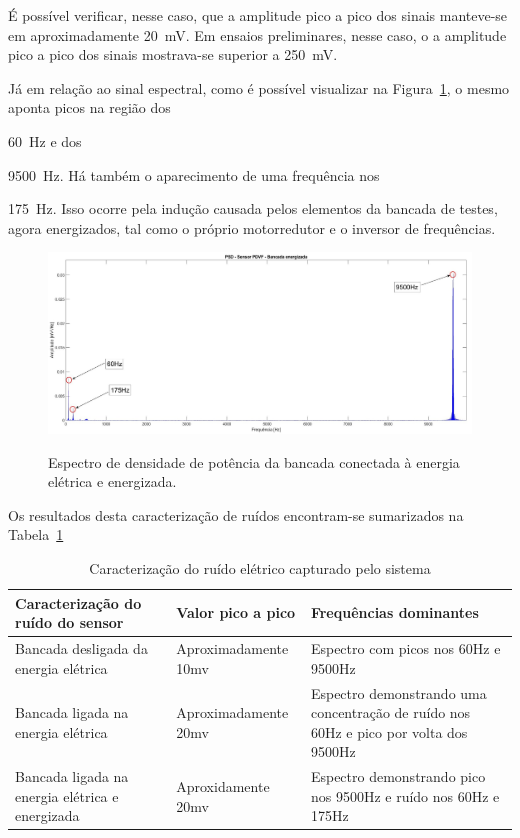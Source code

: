 \documentclass[
	12pt,				
	oneside,			
	a4paper,			
	english,			
	brazil,			
	]{abntex2ppgsi}
\begin{document}
{{{{É possível verificar, nesse caso, que a amplitude pico a pico dos sinais manteve-se em aproximadamente {\SI{20}{\milli\volt}}. Em ensaios preliminares, nesse caso, o a amplitude pico a pico dos sinais mostrava-se superior a {\SI{250}{\milli\volt}}. 

Já em relação ao sinal espectral, como é possível visualizar na Figura~\ref{PSD_SENSOR_MAQUINA_LIGADA_E_ENERGIZADA}, o mesmo aponta picos na região dos {\SI{60}{\hertz} e dos {\SI{9500}{\hertz}. Há também o aparecimento de uma frequência nos {\SI{175}{\hertz}. Isso ocorre pela indução causada pelos elementos da bancada de testes, agora energizados, tal como o próprio motorredutor e o inversor de frequências.   

\begin{figure}[H]
\centering
\caption {Espectro de densidade de potência da bancada conectada à energia elétrica e energizada.}
\includegraphics[width=170mm,keepaspectratio]{PSD_PVDF_BANCADA_ENERGIZADA}
\label{PSD_SENSOR_MAQUINA_LIGADA_E_ENERGIZADA}
\end{figure} 

Os resultados desta caracterização de ruídos encontram-se sumarizados na Tabela~\ref{tab:caraterizaçãoSinal}

\begin{table}[h]
\caption{Caracterização do ruído elétrico capturado pelo sistema}
\begin{tabularx}{\textwidth}{|X|X|X|}
\hline
Caracterização do ruído do sensor               & Valor pico a pico    & Frequências dominantes                                                               \\ \hline
Bancada desligada da energia elétrica           & Aproximadamente 10mv  & Espectro com picos nos 60Hz e 9500Hz                                                           \\ \hline
Bancada ligada na energia elétrica              & Aproximadamente 20mv & Espectro demonstrando uma concentração de ruído nos 60Hz e pico por volta dos 9500Hz \\ \hline
Bancada ligada na energia elétrica e energizada & Aproxidamente 20mv  & Espectro demonstrando pico nos 9500Hz e ruído nos 60Hz e 175Hz           \\ \hline
\end{tabularx}
\label{tab:caraterizaçãoSinal}
\end{table}

}}}}}}}
\end{document}
